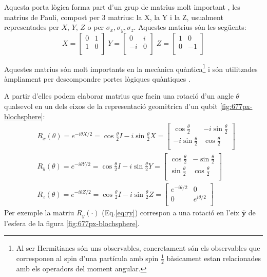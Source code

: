 Aquesta porta lògica forma part d'un grup de matrius molt important , les matrius de Pauli, compost  per 3 matrius: la X, la Y i la Z, usualment representades per $X$, $Y$, $Z$ o per $\sigma_x, \sigma_y, \sigma_z$. Aquestes matrius són les següents:
$$
	 X = \begin{bmatrix} 0 & 1\\ 1 & 0\\ \end{bmatrix} \; Y = \begin{bmatrix} 0 & i\\ -i & 0\\ \end{bmatrix} \; Z = \begin{bmatrix} 1 & 0\\ 0 & -1\\ \end{bmatrix} 
$$

Aquestes matrius són molt importants en la mecànica quàntica\footnote{Al ser Hermitianes són uns observables, concretament són els observables que corresponen al spin d'una partícula amb spin $\frac{1}{2}$ bàsicament estan relacionades amb els operadors del moment angular.} i són utilitzades àmpliament per descompondre portes lògiques quàntiques \cite{QCandQI:pauli}.

A partir d'elles podem elaborar matrius que facin una rotació d'un angle $\theta$ \cite{QCandQI:pauli} qualsevol en un dels eixos de la representació geomètrica d'un qubit \ref{fig:677px-blochsphere}:
\begin{align}
	& R_x(\theta) =  e^{-i\theta X/2} = \cos \frac{\theta}{2}I -i \sin \frac{\theta}{2}X = 
	\begin{bmatrix}
		\cos \frac{\theta}{2} & -i \sin \frac{\theta}{2} \\
		-i\sin \frac{\theta}{2} & \cos\frac{\theta}{2} \\
	\end{bmatrix} \label{eq:rx}\\
	& R_y(\theta) =  e^{-i\theta Y/2} = \cos \frac{\theta}{2}I -i \sin \frac{\theta}{2}Y = 
	\begin{bmatrix}
		\cos \frac{\theta}{2} & -\sin \frac{\theta}{2} \\
		\sin \frac{\theta}{2} & \cos\frac{\theta}{2} \\
	\end{bmatrix} \label{eq:ry}\\
	& R_z(\theta) =  e^{-i\theta Z/2} = \cos \frac{\theta}{2}I -i \sin \frac{\theta}{2}Z = 
	\begin{bmatrix}
		e^{-i\theta/2} & 0 \\
		0 & e^{i\theta/2} \\
	\end{bmatrix} \label{eq:rz}
\end{align}
Per exemple la matriu $R_y(\cdot)$ (Eq.\ref{eq:ry}) correspon a una rotació en l'eix $\hat{\mathbf{y}}$ de l'esfera de la figura \ref{fig:677px-blochsphere}.

